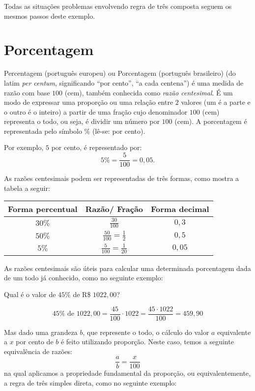 Todas as situações problemas envolvendo regra de três composta seguem os mesmos passos deste exemplo.


\chapter{Porcentagem}

Percentagem (português europeu) ou Porcentagem (português brasileiro) (do latim \textit{per centum}, significando ``por cento'', ``a cada centena'') é uma medida de razão com base $100$ (cem), também conhecida como \textit{razão centesimal}. É um modo de expressar uma proporção ou uma relação entre $2$ valores (um é a parte e o outro é o inteiro) a partir de uma fração cujo denominador $100$ (cem) representa o todo, ou seja, é dividir um número por $100$ (cem). A porcentagem é representada pelo símbolo $\%$ (lê-se: por cento).

Por exemplo, $5$ por cento, é representado por:
\[ 5\%= \frac{5}{100}= 0,05 .\]

As razões centesimais podem ser representadas de três formas, como mostra a tabela a seguir:

\begin{table}[h]
\centering
 \begin{tabular}{|c|c|c|} \hline
  {\textbf{Forma percentual}} & {\textbf{Razão/ Fração}} & \textbf{Forma decimal} \\ \hline
 $30\%$ & $\frac{30}{100}$ & $0,3$ \\\hline
 $50\%$ & $\frac{50}{100} = \frac{1}{2}$ & $0,5$ \\\hline
 $5\%$ & $\frac{5}{100}=\frac{1}{20}$ & $0,05$ \\\hline
 \end{tabular}
\end{table}

As razões centesimais são úteis para calcular uma determinada porcentagem dada de um todo já conhecido, como no seguinte exemplo:
\begin{exem}
 Qual é o valor de $45 \%$ de R\$ $1022,00$?

\[45 \% \text{ de } 1022,00= \frac{45}{100} \cdot 1022= \frac{45\cdot 1022}{100}= 459,90\]
\fim
\end{exem}


Mas dado uma grandeza $b$, que represente o todo, o cálculo do valor $a$ equivalente a $x$ por cento de $b$ é feito utilizando proporção. Neste caso, temos a seguinte equivalência de razões:
\[\frac{a}{b}= \frac{x}{100}\]
na qual aplicamos a propriedade fundamental da proporção, ou equivalentemente, a regra de três simples direta, como no seguinte exemplo:


